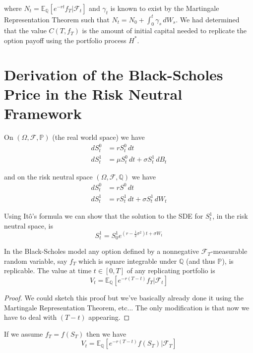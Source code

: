 \documentclass[12pt]{article}
\newenvironment{theorem}[2][Theorem:]{\begin{trivlist} %
\item[\hskip \labelsep {\bfseries #1}\hskip \labelsep {\bfseries #2.}]}{\end{trivlist}}
\begin{document}
where $N_t = \mathbb E_{\mathbb Q}[e^{-rt}f_T|\mathcal F_t]$ and $\gamma_t$ is known to exist by the Martingale Representation Theorem such that $N_t = N_0 + \int^t_0 \gamma_s\,dW_s$. We had determined that the value $C(T,f_T)$ is the amount of initial capital needed to replicate the option payoff using the portfolio process $H^*$.

\section{Derivation of the Black-Scholes Price in the Risk Neutral Framework}

On $(\Omega,\mathcal F,\mathbb P)$ (the real world space) we have
\begin{align*}
	dS^0_t &= rS^0_t\,dt \\
	dS^1_t &= \mu S^0_t\,dt + \sigma S^1_t\,dB_t
\end{align*}

and on the risk neutral space $(\Omega,\mathcal F,\mathbb Q)$ we have
\begin{align*}
	dS^0_t &= rS^0\,dt \\
	dS^1_t &= rS^1_t\,dt + \sigma S^1_t\,dW_t
\end{align*}

Using It\^{o}'s formula we can show that the solution to the SDE for $S^1_t$, in the risk neutral space, is
\begin{equation*}
	S^1_t = S^1_0 e^{(r-\frac{1}{2}\sigma^2)t + \sigma W_t}
\end{equation*}

\begin{theorem}{Risk Neutral Pricing Theorem} In the Black-Scholes model any option defined by a nonnegative $\mathcal F_T$-measurable random variable, say $f_T$ which is square integrable under $\mathbb Q$ (and thus $\mathbb P$), is replicable. The value at time $t \in [0,T]$ of any replicating portfolio is
\begin{equation*}
	V_t = \mathbb E_{\mathbb Q}[e^{-r(T-t)}f_T|\mathcal F_t]
\end{equation*}

\begin{proof} We could sketch this proof but we've basically already done it using the Martingale Representation Theorem, etc... The only modification is that now we have to deal with $(T - t)$ appearing.
\end{proof}
\end{theorem}

If we assume $f_T = f(S_T)$ then we have
\begin{equation*}
	V_t = \mathbb E_{\mathbb Q}[e^{-r(T-t)}f(S_T) | \mathcal F_T]
\end{equation*}
\end{document}
